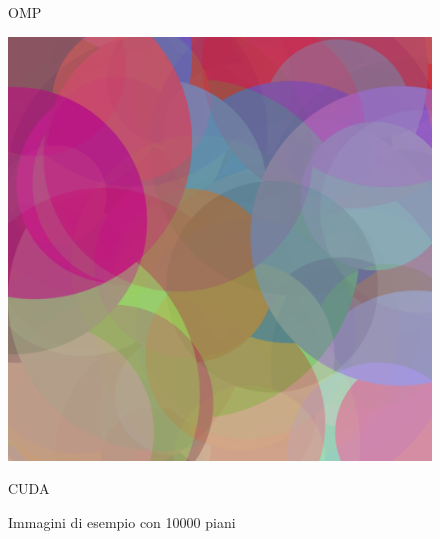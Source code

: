 \documentclass[11pt]{article}
\begin{document}
\begin{figure}[h!]
\begin{minipage}{0.32\textwidth}
            \caption{OMP}
        \end{minipage}%
        \hfill
        \begin{minipage}{0.32\textwidth}
            \centering
            \includegraphics[width=\textwidth]{img/cuda/10000}
            \caption{CUDA}
        \end{minipage}
        \caption{Immagini di esempio con 10000 piani}\label{fig:example-images}
    \end{figure}
\end{document}
